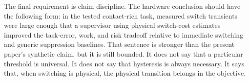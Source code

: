 \documentclass{article}
\begin{document}
The final requirement is claim discipline.
The hardware conclusion should have the following form: in the tested contact-rich task, measured switch transients were large enough that a supervisor using physical switch-cost estimates improved the task-error, work, and risk tradeoff relative to immediate switching and generic suppression baselines.
That sentence is stronger than the present paper's synthetic claim, but it is still bounded.
It does not say that a particular threshold is universal.
It does not say that hysteresis is always necessary.
It says that, when switching is physical, the physical transition belongs in the objective.
\end{document}
